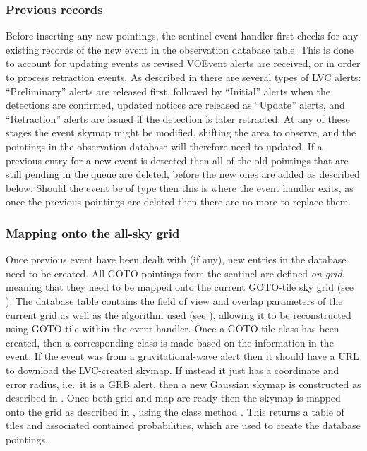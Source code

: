 \begin{colsection}
\begin{colsection}
\subsubsection{Previous records}

Before inserting any new pointings, the sentinel event handler first checks for any existing records of the new event in the observation database  table. This is done to account for updating events as revised VOEvent alerts are received, or in order to process retraction events. As described in  there are several types of LVC alerts: ``Preliminary'' alerts are released first, followed by ``Initial'' alerts when the detections are confirmed, updated notices are released as ``Update'' alerts, and ``Retraction'' alerts are issued if the detection is later retracted. At any of these stages the event skymap might be modified, shifting the area to observe, and the pointings in the observation database will therefore need to updated. If a previous entry for a new event is detected then all of the old pointings that are still pending in the queue are deleted, before the new ones are added as described below. Should the event be of type  then this is where the event handler exits, as once the previous pointings are deleted then there are no more to replace them.

\subsubsection{Mapping onto the all-sky grid}

Once previous event have been dealt with (if any), new entries in the database need to be created. All GOTO pointings from the sentinel are defined \textit{on-grid}, meaning that they need to be mapped onto the current GOTO-tile sky grid (see ). The database  table contains the field of view and overlap parameters of the current grid as well as the algorithm used (see ), allowing it to be reconstructed using GOTO-tile within the event handler. Once a GOTO-tile  class has been created, then a corresponding  class is made based on the information in the event. If the event was from a gravitational-wave alert then it should have a URL to download the LVC-created skymap. If instead it just has a coordinate and error radius, i.e.\ it is a GRB alert, then a new Gaussian skymap is constructed as described in . Once both grid and map are ready then the skymap is mapped onto the grid as described in , using the class method . This returns a table of tiles and associated contained probabilities, which are used to create the database pointings. %


\end{colsection}
\end{colsection}
